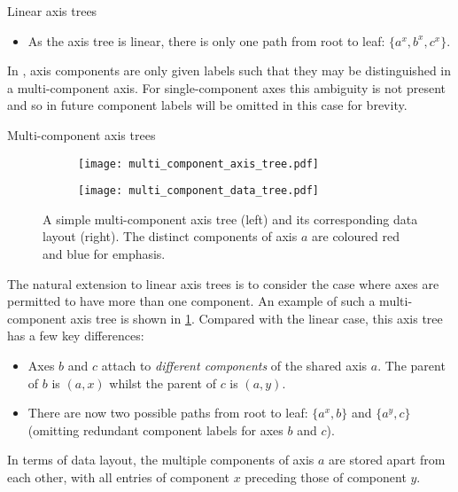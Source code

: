 \documentclass[thesis]{subfiles}
\begin{document}
\begin{example}{Linear axis trees}
\begin{itemize}
  \item
    As the axis tree is linear, there is only one path from root to leaf: $\{ a^x, b^x, c^x \}$.
\end{itemize}

In , axis components are only given labels such that they may be distinguished in a multi-component axis.
For single-component axes this ambiguity is not present and so in future component labels will be omitted in this case for brevity.

\end{example}

\begin{example}{Multi-component axis trees}

\begin{figure}
  \begin{subfigure}{.4\textwidth}
    \centering
    \texttt{[image: multi\_component\_axis\_tree.pdf]}
  \end{subfigure}
  \begin{subfigure}{.4\textwidth}
    \centering
    \texttt{[image: multi\_component\_data\_tree.pdf]}
  \end{subfigure}
  \caption{
    A simple multi-component axis tree (left) and its corresponding data layout (right).
    The distinct components of axis $a$ are coloured red and blue for emphasis.
  }
  \label{fig:multi_component_axis_tree_intro}
\end{figure}

The natural extension to linear axis trees is to consider the case where axes are permitted to have more than one component.
An example of such a multi-component axis tree is shown in \cref{fig:multi_component_axis_tree_intro}.
Compared with the linear case, this axis tree has a few key differences:

\begin{itemize}
  \item
    Axes $b$ and $c$ attach to \emph{different components} of the shared axis $a$.
    The parent of $b$ is $(a, x)$ whilst the parent of $c$ is $(a, y)$.

  \item
    There are now two possible paths from root to leaf: $\{ a^x, b \}$ and $\{ a^y, c \}$ (omitting redundant component labels for axes $b$ and $c$).
\end{itemize}

In terms of data layout, the multiple components of axis $a$ are stored apart from each other, with all entries of component $x$ preceding those of component $y$.

\end{example}
\end{document}

